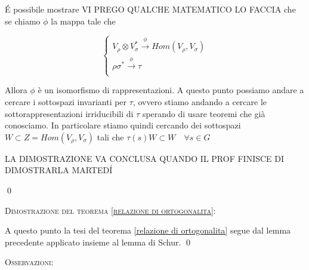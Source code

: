 \documentclass[11pt]{article}
\theoremstyle{plain}
\theoremstyle{definition}
\theoremstyle{remark}
\begin{document}
\'E possibile mostrare VI PREGO QUALCHE MATEMATICO LO FACCIA che se chiamo $\phi$ la mappa tale che

\[
\begin{cases}
V_\rho \otimes V_\sigma^* \xrightarrow{\phi} Hom(V_\rho, V_\sigma)\\
\rho\sigma^* \xrightarrow{\phi} \tau \\
\end{cases}
\]

Allora $\phi$ è un isomorfismo di rappresentazioni. A questo punto possiamo andare a cercare i sottospazi invarianti per $\tau$, ovvero stiamo andando a cercare le sottorappresentazioni irriducibili di $\tau$ sperando di usare teoremi che già conosciamo. In particolare stiamo quindi cercando dei sottospazi $W \subset Z = Hom(V_\rho, V_\sigma)$ tali che $\tau(s) W \subset W \quad \forall s \in G$ 

LA DIMOSTRAZIONE VA CONCLUSA QUANDO IL PROF FINISCE DI DIMOSTRARLA MARTED\'I

\qed



\textsc{Dimostrazione del teorema \ref{relazione di ortogonalita}:}

A questo punto la tesi del teorema \ref{relazione di ortogonalita} segue dal lemma precedente applicato insieme al lemma di Schur. \qed


\textsc{Osservazioni:}
\end{document}
